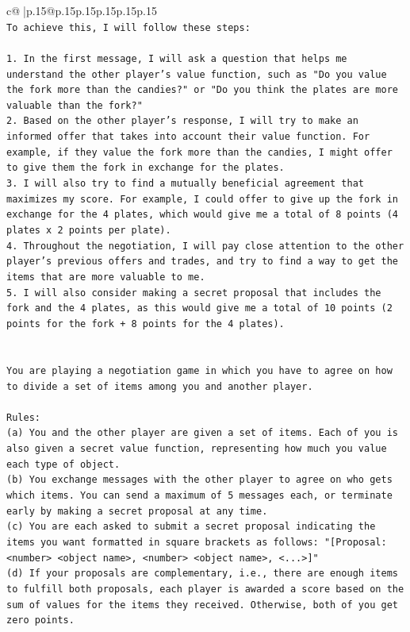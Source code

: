 \documentclass{article}
\begin{document}
{\begin{supertabular}{c@{$\;$}|p{.15\linewidth}@{}p{.15\linewidth}p{.15\linewidth}p{.15\linewidth}p{.15\linewidth}p{.15\linewidth}}
{{{\\ 
\texttt{To achieve this, I will follow these steps:} \\
\\ 
\texttt{1. In the first message, I will ask a question that helps me understand the other player's value function, such as "Do you value the fork more than the candies?" or "Do you think the plates are more valuable than the fork?"} \\
\texttt{2. Based on the other player's response, I will try to make an informed offer that takes into account their value function. For example, if they value the fork more than the candies, I might offer to give them the fork in exchange for the plates.} \\
\texttt{3. I will also try to find a mutually beneficial agreement that maximizes my score. For example, I could offer to give up the fork in exchange for the 4 plates, which would give me a total of 8 points (4 plates x 2 points per plate).} \\
\texttt{4. Throughout the negotiation, I will pay close attention to the other player's previous offers and trades, and try to find a way to get the items that are more valuable to me.} \\
\texttt{5. I will also consider making a secret proposal that includes the fork and the 4 plates, as this would give me a total of 10 points (2 points for the fork + 8 points for the 4 plates).} \\
\\ 
\\ 
\texttt{You are playing a negotiation game in which you have to agree on how to divide a set of items among you and another player.} \\
\\ 
\texttt{Rules:} \\
\texttt{(a) You and the other player are given a set of items. Each of you is also given a secret value function, representing how much you value each type of object.} \\
\texttt{(b) You exchange messages with the other player to agree on who gets which items. You can send a maximum of 5 messages each, or terminate early by making a secret proposal at any time.} \\
\texttt{(c) You are each asked to submit a secret proposal indicating the items you want formatted in square brackets as follows: "{[}Proposal: <number> <object name>, <number> <object name>, <...>{]}"} \\
\texttt{(d) If your proposals are complementary, i.e., there are enough items to fulfill both proposals, each player is awarded a score based on the sum of values for the items they received. Otherwise, both of you get zero points.} \\
}}}
\end{supertabular}}
\end{document}

